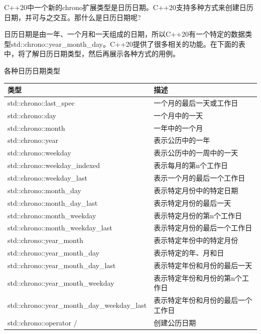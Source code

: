 
C++20中一个新的chrono扩展类型是日历日期。C++20支持多种方式来创建日历日期，并可与之交互。那什么是日历日期呢?

日历日期是由一年、一个月和一天组成的日期，所以C++20有一个特定的数据类型std::chrono::year\_month\_day。C++20提供了很多相关的功能。在下面的表中，将了解日历日期类型，然后再展示各种方式的用例。

\begin{center}
各种日历日期类型
\end{center}

\begin{table}[H]
\centering
\begin{tabular}{ll}
\textbf{类型}                 & \textbf{描述}                                   \\ \hline
std::chrono::last\_spec       & 一个月的最后一天或工作日           \\
std::chrono::day              & 一个月中的一天                            \\
std::chrono::month            & 一年中的一个月                           \\
std::chrono::year             & 表示公历中的一年            \\
std::chrono::weekday          & 表示公历中的一周中的一天 \\
std::chrono::weekday\_indexed & 表示每月的第n个工作日                 \\
std::chrono::weekday\_last    & 表示一个月的最后一个工作日                 \\
std::chrono::month\_day       & 表示特定月份中的特定日期          \\
std::chrono::month\_day\_last & 表示特定月份的最后一天            \\
std::chrono::month\_weekday   & 表示特定月份的第n个工作日        \\
std::chrono::month\_weekday\_last            & 表示特定月份的最后一个工作日           \\
std::chrono::year\_month      & 表示特定年份中的特定月份         \\
std::chrono::year\_month\_day & 表示特定的年、月和日             \\
std::chrono::year\_month\_day\_last          & 表示特定年份和月份的最后一天      \\
std::chrono::year\_month\_weekday            & 表示特定年份和月份的第n个工作日  \\
std::chrono::year\_month\_day\_weekday\_last & 表示特定年份和月份的最后一个工作日 \\
std::chrono::operator /       & 创建公历日期              
\end{tabular}
\end{table}

